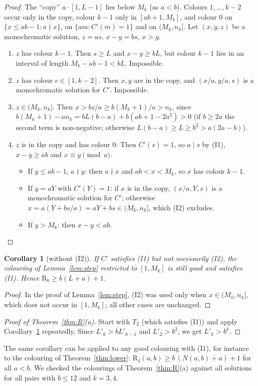 \documentclass[11pt,a4paper]{article}
\newtheorem{corollary}[theorem]{Corollary}
\theoremstyle{definition}
\theoremstyle{remark}
\newcommand{\R}{\mathrm{R}}
\begin{document}
\begin{proof}
The ``copy'' $a\cdot[1,L-1]$ lies below $M_k$ (as $a<b$). Colours $1,\dots,k-2$ occur only in the copy, colour $k-1$ only in $[ab+1,M_k]$, and colour $0$ on $\{x\le ab-1:a\nmid x\}$, on $\{am:C'(m)=1\}$ and on $(M_k,n_k]$. Let $(x,y,z)$ be a monochromatic solution, $z=as$, $x-y=bs$, $x>y$.
\begin{enumerate}[label=(\roman*)]
\item $z$ has colour $k-1$. Then $s\ge L$ and $x-y\ge bL$, but colour $k-1$ lies in an interval of length $M_k-ab-1<bL$. Impossible.
\item $z$ has colour $c\in[1,k-2]$. Then $x,y$ are in the copy, and $(x/a,y/a,s)$ is a monochromatic solution for $C'$. Impossible.
\item $z\in(M_k,n_k]$. Then $x>bz/a\ge b(M_k+1)/a>n_k$, since $b(M_k+1)-an_k=bL(b-a)+b(ab+1-2a^2)>0$ (if $b\ge2a$ the second term is non-negative; otherwise $L(b-a)\ge L\ge b^2>a(2a-b)$).
\item $z$ is in the copy and has colour $0$. Then $C'(s)=1$, so $a\mid s$ by (I1), $x-y\ge ab$ and $x\equiv y\pmod a$.
  \begin{itemize}
  \item If $y\le ab-1$, $a\nmid y$: then $a\nmid x$ and $ab<x<M_k$, so $x$ has colour $k-1$.
  \item If $y=aY$ with $C'(Y)=1$: if $x$ is in the copy, $(x/a,Y,s)$ is a monochromatic solution for $C'$; otherwise $x=a(Y+bs/a)=aY+bs\in(M_k,n_k]$, which (I2) excludes.
  \item If $y>M_k$: then $x-y<ab$. \qedhere
  \end{itemize}
\end{enumerate}
\end{proof}

\begin{corollary}[without (I2)]\label{cor:noI2}
If $C'$ satisfies (I1) but not necessarily (I2), the colouring of Lemma~\ref{lem:step} restricted to $[1,M_k]$ is still good and satisfies (I1). Hence $\R_k\ge b(L+a)+1$.
\end{corollary}
\begin{proof}
In the proof of Lemma~\ref{lem:step}, (I2) was used only when $x\in(M_k,n_k]$, which does not occur in $[1,M_k]$; all other cases are unchanged.
\end{proof}
\begin{proof}[Proof of Theorem~\ref{thm:R}(a)]
Start with $T_2$ (which satisfies (I1)) and apply Corollary~\ref{cor:noI2} repeatedly. Since $L'_k>bL'_{k-1}$ and $L'_2>b^2$, we get $L'_k>b^k$.
\end{proof}
The same corollary can be applied to any good colouring with (I1), for instance to the colouring of Theorem~\ref{thm:lower}: $\R_4(a,b)\ge b\,(N(a,b)+a)+1$ for all $a<b$. We checked the colourings of Theorem~\ref{thm:R}(a) against all solutions for all pairs with $b\le12$ and $k=3,4$.
\end{document}
